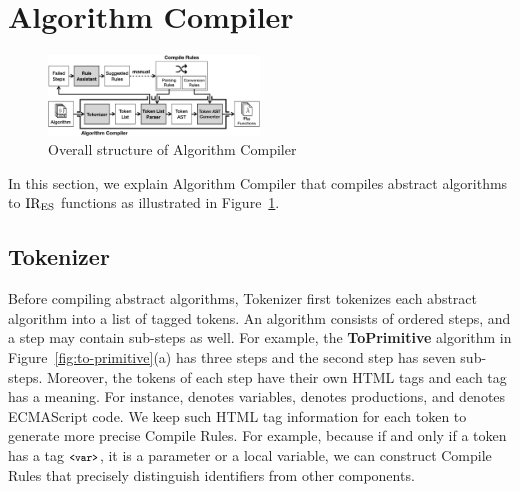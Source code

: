 \section{Algorithm Compiler}\label{sec:compiler}
\begin{figure}
  \centering
  \includegraphics[width=0.5\textwidth]{img/algo_compiler.png}
  \caption{Overall structure of {\sf Algorithm Compiler}}
  \label{fig:algo-compiler}
\end{figure}

In this section, we explain {\sf Algorithm Compiler} that compiles
abstract algorithms to \( \text{IR}_\text{ES} \) functions as illustrated in
Figure~\ref{fig:algo-compiler}.

\subsection{Tokenizer}
Before compiling abstract algorithms, {\sf Tokenizer} first tokenizes
each abstract algorithm into a list of tagged tokens.  An algorithm
consists of ordered steps, and a step may contain sub-steps as well.
For example, the \textbf{\small ToPrimitive} algorithm in
Figure~\ref{fig:to-primitive}(a) has three steps and the second step
has seven sub-steps.  Moreover, the tokens of each step have their own
HTML tags and each tag has a meaning.  For instance, 
denotes variables,  denotes productions, and
 denotes ECMAScript code.
We keep such HTML tag information for each token to generate more precise
{\sf Compile Rules}.  For example, because if and only if a token has
a tag \( \texttt{\footnotesize<var>} \), it is a parameter or a local variable, we can
construct {\sf Compile Rules} that precisely distinguish identifiers
from other components.


